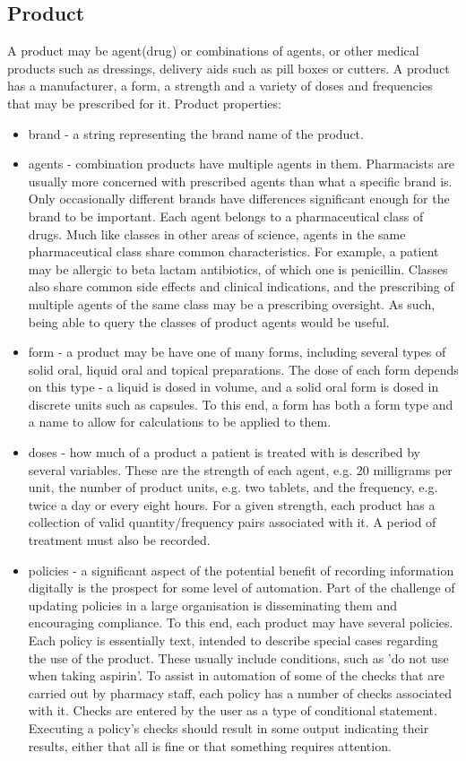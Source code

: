 \documentclass[letterpaper]{amsart}
\begin{document}
\subsection{Product}
A product may be agent(drug) or combinations of agents, or other medical products such as dressings, delivery aids such as pill boxes or cutters.  
A product has a manufacturer, a form, a strength and a variety of doses and frequencies that may be prescribed for it. 
Product properties:
\begin{itemize}
    \item brand - a string representing the brand name of the product. 
    \item agents - combination products have multiple agents in them.  Pharmacists are usually more concerned with prescribed agents than what a specific brand is.  Only occasionally different brands have differences significant enough for the brand to be important. Each agent belongs to a pharmaceutical class of drugs. Much like classes in other areas of science, agents in the same pharmaceutical class share common characteristics.  For example, a patient may be allergic to beta lactam antibiotics, of which one is penicillin.
	Classes also share common side effects and clinical indications, and the prescribing of multiple agents of the same class may be a prescribing oversight.  As such, being able to query the classes of product agents would be useful.
    \item form - a product may be have one of many forms, including several types of solid oral, liquid oral and topical preparations.  The dose of each form depends on this type - a liquid is dosed in volume, and a solid oral form is dosed in discrete units such as capsules.  To this end, a form has both a form type and a name to allow for calculations to be applied to them. 
    \item doses - how much of a product a patient is treated with is described by several variables.  These are the strength of each agent, e.g. 20 milligrams per unit, the number of product units, e.g. two tablets, and the frequency, e.g. twice a day or every eight hours.
    For a given strength, each product has a collection of valid quantity/frequency pairs associated with it.  A period of treatment must also be recorded.
    \item policies - a significant aspect of the potential benefit of recording information digitally is the prospect for some level of automation.  Part of the challenge of updating policies in a large organisation is disseminating them and encouraging compliance.  To this end, each product may have several policies.  Each policy is essentially text, intended to describe special cases regarding the use of the product.  These usually include conditions, such as 'do not use when taking aspirin'.  To assist in automation of some of the checks that are carried out by pharmacy staff, each policy has a number of checks associated with it.  Checks are entered by the user as a type of conditional statement.  Executing a policy's checks should result in some output indicating their results, either that all is fine or that something requires attention. 

\end{itemize}
\end{document}
